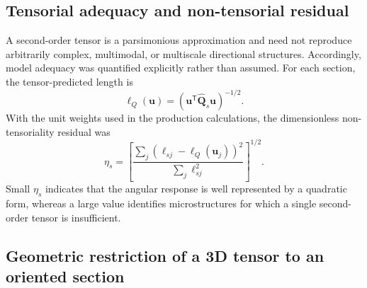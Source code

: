 \documentclass{article}
\begin{document}
\subsection{Tensorial adequacy and non-tensorial residual}
\label{subsec:nontensoriality}

A second-order tensor is a parsimonious approximation and need not reproduce
arbitrarily complex, multimodal, or multiscale directional structures.
Accordingly, model adequacy was quantified explicitly rather than assumed.
For each section, the tensor-predicted length is
\begin{equation}
    \ell_{Q}(\bm{u})
    =
    \left(
        \bm{u}^{\mathsf T}
        \widehat{\bm{Q}}_{s}
        \bm{u}
    \right)^{-1/2}.
    \label{eq:tensor_predicted_length}
\end{equation}
With the unit weights used in the production calculations, the dimensionless
non-tensoriality residual was
\begin{equation}
    \eta_{s}
    =
    \left[
    \frac{
        \sum_{j}
        \left(
            \ell_{sj}-\ell_{Q}(\bm{u}_{j})
        \right)^{2}
    }{
        \sum_{j}\ell_{sj}^{2}
    }
    \right]^{1/2}.
    \label{eq:nontensoriality}
\end{equation}
Small $\eta_{s}$ indicates that the angular response is well represented by
a quadratic form, whereas a large value identifies microstructures for which
a single second-order tensor is insufficient.

\subsection{Geometric restriction of a 3D tensor to an oriented section}
\label{subsec:restriction_law}
\end{document}

